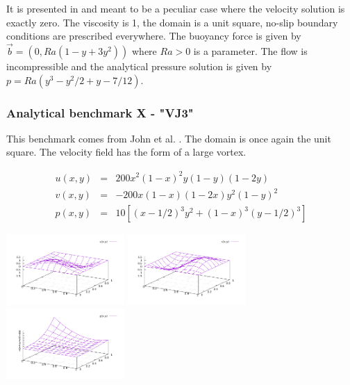 It is presented in \cite{jolm17} and meant to be a peculiar case where the velocity solution 
is exactly zero. The viscosity is 1, the domain is a unit square, no-slip boundary conditions 
are prescribed everywhere. The buoyancy force is given by $\vec{b}=(0,Ra(1-y+3y^2))$ where 
$Ra>0$ is a parameter. The flow is incompressible and the analytical pressure solution 
is given by $p=Ra(y^3-y^2/2+y-7/12)$.

\subsubsection{Analytical benchmark X \label{mms10} - "VJ3"}

This benchmark comes from John et al. \cite{jolm17}.
The domain is once again the unit square. The velocity field has the form of a large vortex.

\begin{eqnarray}
u(x,y) &=& 200x^2(1-x)^2y(1-y)(1-2y) \\
v(x,y) &=& -200x(1-x)(1-2x)y^2(1-y)^2 \\
p(x,y) &=& 10\left[(x-1/2)^3y^2+(1-x)^3(y-1/2)^3 \right]
\end{eqnarray}

\begin{center}
\includegraphics[width=4.5cm]{images/benchmark_VJ3/u.pdf}
\includegraphics[width=4.5cm]{images/benchmark_VJ3/v.pdf}
\includegraphics[width=4.5cm]{images/benchmark_VJ3/p.pdf}
\end{center}

